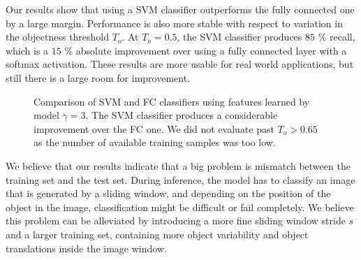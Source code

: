 Our results show that using a SVM classifier outperforms the fully connected one by a large margin. Performance is also more stable with respect to variation in the objectness threshold $T_o$. At $T_o = 0.5$, the SVM classifier produces $85$ \% recall, which is a $15$ \% absolute improvement over using a fully connected layer with a softmax activation. These results are more usable for real world applications, but still there is a large room for improvement.

\begin{figure}[t]
	\forcerectofloat
	\centering
	\caption[Comparison of SVM and FC classifiers using features learned by model $\gamma = 3$]{Comparison of SVM and FC classifiers using features learned by model $\gamma = 3$. The SVM classifier produces a considerable improvement over the FC one. We did not evaluate past $T_o > 0.65$ as the number of available training samples was too low.}
	\label{apps-detection:finetuningResults}
\end{figure}

We believe that our results indicate that a big problem is mismatch between the training set and the test set. During inference, the model has to classify an image that is generated by a sliding window, and depending on the position of the object in the image, classification might be difficult or fail completely. We believe this problem can be alleviated by introducing a more fine sliding window stride $s$ and a larger training set, containing more object variability and object translations inside the image window.

